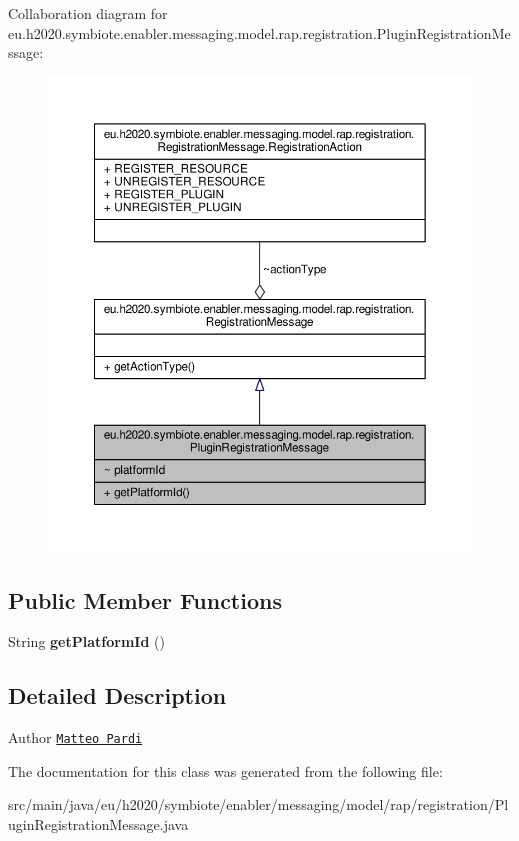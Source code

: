 Collaboration diagram for eu.\+h2020.\+symbiote.\+enabler.\+messaging.\+model.\+rap.\+registration.\+Plugin\+Registration\+Message\+:
\nopagebreak
\begin{figure}[H]
\begin{center}
\leavevmode
\includegraphics[width=350pt]{classeu_1_1h2020_1_1symbiote_1_1enabler_1_1messaging_1_1model_1_1rap_1_1registration_1_1PluginRegistrationMessage__coll__graph}
\end{center}
\end{figure}
\subsection*{Public Member Functions}
\begin{DoxyCompactItemize}
\item 
\mbox{\label{classeu_1_1h2020_1_1symbiote_1_1enabler_1_1messaging_1_1model_1_1rap_1_1registration_1_1PluginRegistrationMessage_a819e9fb95733f9b557bd8c99396d238b}} 
String {\bfseries get\+Platform\+Id} ()
\end{DoxyCompactItemize}


\subsection{Detailed Description}
\begin{DoxyAuthor}{Author}
\href{mailto:m.pardi@nextworks.it}{\tt Matteo Pardi} 
\end{DoxyAuthor}


The documentation for this class was generated from the following file\+:\begin{DoxyCompactItemize}
\item 
src/main/java/eu/h2020/symbiote/enabler/messaging/model/rap/registration/Plugin\+Registration\+Message.\+java\end{DoxyCompactItemize}
